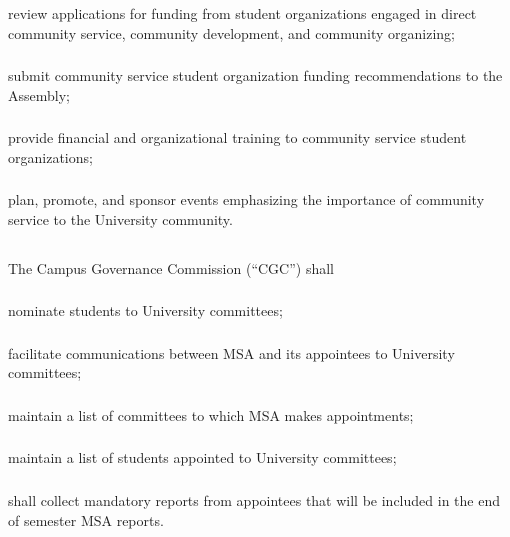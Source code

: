 \subsubsection{}
review applications for funding from student organizations engaged in direct community service, community development, and community organizing;
\subsubsection{}
submit community service student organization funding recommendations to the Assembly;
\subsubsection{}
provide financial and organizational training to community service student organizations;
\subsubsection{}
plan, promote, and sponsor events emphasizing the importance of community service to the University community.

\subsection{}
The Campus Governance Commission (``CGC'') shall
\subsubsection{}
nominate students to University committees;
\subsubsection{}
facilitate communications between MSA and its appointees to University committees;
\subsubsection{}
maintain a list of committees to which MSA makes appointments;
\subsubsection{}
maintain a list of students appointed to University committees;
\subsubsection{}
shall collect mandatory reports from appointees that will be included in the end of semester MSA reports.

